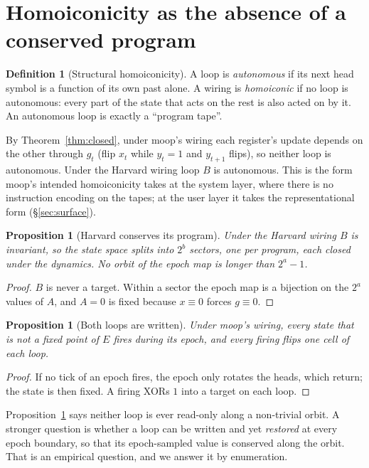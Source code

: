 \documentclass[11pt]{article}
\newtheorem{proposition}[theorem]{Proposition}
\theoremstyle{definition}
\newtheorem{definition}[theorem]{Definition}
\theoremstyle{remark}
\newcommand{\moop}{\textsf{moop}}
\begin{document}
\section{Homoiconicity as the absence of a conserved program}
\label{sec:homoiconicity}

\begin{definition}[Structural homoiconicity]
\label{def:homoiconic}
A loop is \emph{autonomous} if its next head symbol is a function of its
own past alone. A wiring is \emph{homoiconic} if no loop is autonomous:
every part of the state that acts on the rest is also acted on by it. An
autonomous loop is exactly a ``program tape''.
\end{definition}

By Theorem~\ref{thm:closed}, under \moop{}'s wiring each register's
update depends on the other through $g_t$ (flip $x_t$ while $y_t=1$ and
$y_{t+1}$ flips), so neither loop is autonomous. Under the Harvard wiring
loop $B$ is autonomous. This is the form \moop{}'s intended homoiconicity
takes at the system layer, where there is no instruction encoding on the
tapes; at the user layer it takes the representational form
(\S\ref{sec:surface}).

\begin{proposition}[Harvard conserves its program]
\label{prop:harvard}
Under the Harvard wiring $B$ is invariant, so the state space splits
into $2^b$ sectors, one per program, each closed under the dynamics. No
orbit of the epoch map is longer than $2^a-1$.
\end{proposition}
\begin{proof}
$B$ is never a target. Within a sector the epoch map is a bijection on
the $2^a$ values of $A$, and $A=0$ is fixed because $x\equiv0$ forces
$g\equiv0$.
\end{proof}

\begin{proposition}[Both loops are written]
\label{prop:written}
Under \moop{}'s wiring, every state that is not a fixed point of $E$
fires during its epoch, and every firing flips one cell of each loop.
\end{proposition}
\begin{proof}
If no tick of an epoch fires, the epoch only rotates the heads, which
return; the state is then fixed. A firing XORs $1$ into a target on each
loop.
\end{proof}

Proposition~\ref{prop:written} says neither loop is ever read-only along
a non-trivial orbit. A stronger question is whether a loop can be
written and yet \emph{restored} at every epoch boundary, so that its
epoch-sampled value is conserved along the orbit. That is an empirical
question, and we answer it by enumeration.
\end{document}

